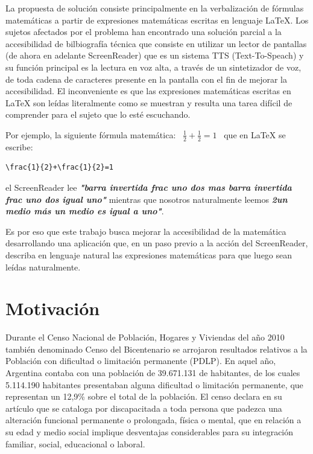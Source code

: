 La propuesta de solución consiste principalmente en la verbalización de fórmulas matemáticas a partir de expresiones matemáticas escritas en lenguaje \LaTeX{}.
Los sujetos afectados por el problema han encontrado una solución parcial a la accesibilidad de bilbiografía técnica que consiste en utilizar un lector de pantallas (de ahora en adelante ScreenReader) que es un sistema TTS (Text-To-Speach) y su función principal es la lectura en voz alta, a través de un sintetizador de voz, de toda cadena de caracteres presente en la pantalla con el fin de mejorar la accesibilidad.
El inconveniente es que las expresiones matemáticas escritas en \LaTeX{} son leídas literalmente como se muestran y resulta una tarea difícil de comprender para el sujeto que lo esté escuchando.\

Por ejemplo, la siguiente fórmula matemática: \
\textbf{$\frac{1}{2}+\frac{1}{2}=1$} \
que en \LaTeX{} se escribe: \begin{lstlisting}
\frac{1}{2}+\frac{1}{2}=1 \end{lstlisting}
el ScreenReader lee \textbf{\textit{"barra invertida frac uno dos mas barra invertida frac uno dos igual uno"}} mientras que nosotros naturalmente leemos \textbf{\textit{2un medio más un medio es igual a uno"}}.\

Es por eso que este trabajo busca mejorar la accesibilidad de la matemática desarrollando una aplicación que, en un paso previo a la acción del ScreenReader, describa en lenguaje natural las expresiones matemáticas para que luego sean leídas naturalmente.

\section{Motivación}

Durante el Censo Nacional de Población, Hogares y Viviendas del año 2010 \cite{1} también denominado Censo del Bicentenario se arrojaron resultados
relativos a la Población con dificultad o limitación permanente (PDLP). En aquel año, Argentina contaba con una población de 39.671.131 de habitantes, de los cuales
5.114.190 habitantes presentaban alguna dificultad o limitación permanente, que representan un 12,9\% sobre el total de la población.
{}
El censo declara en su artículo que se cataloga por discapacitada a toda persona que padezca una alteración funcional permanente o prolongada,
física o mental, que en relación a su edad y medio social implique desventajas considerables para su integración familiar, social, educacional o laboral.\\

